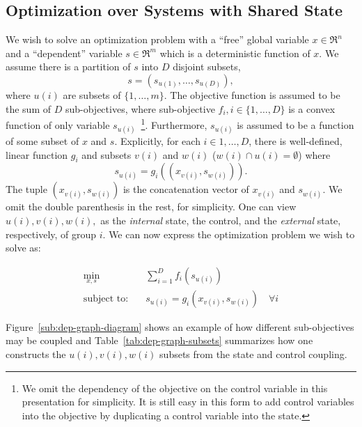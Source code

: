 \subsection{Optimization over Systems with Shared State}
\label{sec:problem_statement}

We wish to solve an optimization problem with a ``free'' global variable $x \in \Re^n$ and a ``dependent'' variable $s \in \Re^m$ which is a deterministic function of $x$.
We assume there is a partition of $s$ into $D$ disjoint subsets,
\[
s=\left(s_{u\left(1\right)},\ldots,s_{u\left(D\right)}\right),
\] where $u\left(i\right)$ are subsets of $ \{1,\ldots,m\} $.
The objective function is assumed to be the sum of $D$ sub-objectives, where sub-objective $f_i, i\in \{1,\ldots,D\} $ is a convex function of only variable $s_{u\left(i\right)}$~\footnote{We omit the dependency of the objective on the control variable in this presentation for simplicity. It is still easy in this form to add control variables into the objective by duplicating a control variable into the state.}.
Furthermore, $s_{u\left(i\right)}$ is assumed to be a function of some subset of $x$ and $s$.
Explicitly, for each $i\in {1,\ldots, D} $, there is well-defined, linear function $g_i$ and subsets $v\left(i\right)$ and $w\left(i\right)$ ($w\left(i\right) \cap u\left(i\right) = \emptyset$) where 
\[
s_{u\left(i\right)} = g_i\left(\left(x_{v\left(i\right)}, s_{w\left(i\right)}\right)\right).
\]
The tuple $\left(x_{v\left(i\right)}, s_{w\left(i\right)}\right)$ is the concatenation vector of $x_{v\left(i\right)}$ and $s_{w\left(i\right)}$.
We omit the double parenthesis in the rest, for simplicity. One can view $u\left(i\right), v\left(i\right), w\left(i\right), $ as the \emph{internal} state, the control, and the \emph{external} state, respectively, of group $i$. 
We can now express the optimization problem we wish to solve as:

\begin{align}
	\label{eq:problem-statement}
	\min_{x,s} & \quad \sum_{i = 1}^D f_i\left(s_{u\left(i\right)}\right) \\
	\text{subject to:} & \quad s_{u\left(i\right)} = g_i\left(x_{v\left(i\right)}, s_{w\left(i\right)}\right) \quad \forall i
\end{align}

Figure~\ref{sub:dep-graph-diagram} shows an example of how different sub-objectives may be coupled and Table~\ref{tab:dep-graph-subsets} summarizes how one constructs the $u\left(i\right), v\left(i\right), w\left(i\right)$ subsets from the state and control coupling.


